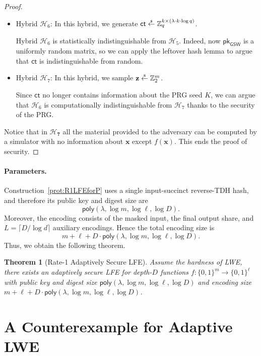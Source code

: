 \documentclass{article}
\newtheorem{theorem}{Theorem}\newtheorem{lemma}[theorem]{Lemma}\newtheorem{proposition}[theorem]{Proposition}\newtheorem{corollary}[theorem]{Corollary}\newtheorem{definition}[theorem]{Definition}\newtheorem{claim}[theorem]{Claim}
\newcommand{\getsr}{\overset{\raisebox{-1pt}{$\scriptscriptstyle \$$}}{\gets}}
\newcommand{\sample}{\getsr}
\newcommand{\Z}{\mathbb{Z}}
\newcommand{\poly}{\mathsf{poly}}
\renewcommand{\sec}{\ensuremath{\lambda}}
\newcommand{\ct}{\mathsf{ct}}
\newcommand{\BV}{\mathsf{GSW}}
\newcommand{\pk}{{\mathsf{pk}}}
\begin{document}
\begin{proof}
\begin{itemize}
\item Hybrid ${\mathcal{H}_6}$: In this hybrid, we generate $\ct\sample\Z_q^{k\times (\sec\cdot k\cdot \log q)}$.


Hybrid ${\mathcal{H}_6}$ is statistically indistinguishable from ${\mathcal{H}_5}$. Indeed, now $\pk_\BV$ is a uniformly random matrix, so we can apply the leftover hash lemma to argue that $\ct$ is indistinguishable from random.

\item Hybrid ${\mathcal{H}_7}$: In this hybrid, we sample $\mathbf{z}\sample\Z_2^{m}$.


Since $\ct$ no longer contains information about the PRG seed $K$, we can argue that ${\mathcal{H}_6}$ is computationally indistinguishable from ${\mathcal{H}_7}$ thanks to the security of the PRG.
\end{itemize}

 Notice that in $\mathbf{\mathcal{H}_7}$ all the material provided to the adversary can be computed by a simulator with no information about $\mathbf{x}$ except $f(\mathbf{x})$. This ends the proof of security.
\end{proof}

{\paragraph{Parameters.} Construction~\ref{prot:R1LFEforP}
uses a single input-succinct reverse-TDH hash, and therefore its public key and digest
size are
\[
\poly(\lambda,\log m,\log \ell,\log D).
\]
Moreover, the encoding consists of the masked input, the final output share,
and $L=\lceil D/\log d\rceil$ auxiliary encodings. Hence the total encoding
size is
\[
m+\ell+D\cdot \poly(\lambda,\log m,\log \ell,\log D).
\]
Thus, we obtain the following theorem.}

{
\begin{theorem}[Rate-1 Adaptively Secure LFE]
Assume the hardness of LWE, there exists an adaptively secure LFE for
depth-$D$ functions
$f:\{0,1\}^m\to\{0,1\}^\ell$
with public key and digest size $\poly(\lambda,\log m,\log \ell,\log D)$
and encoding size
$m+\ell+D\cdot \poly(\lambda,\log m,\log \ell,\log D)$.
\end{theorem}}
\section{A Counterexample for Adaptive LWE}\label{sec:counter}
\end{document}
